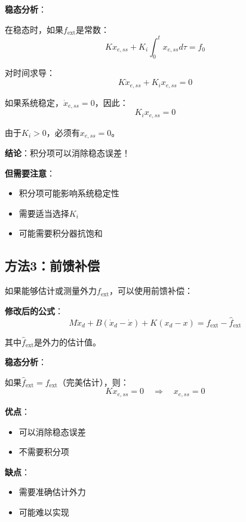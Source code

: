 \documentclass[12pt,a4paper]{article}
\begin{document}
\textbf{稳态分析}：

在稳态时，如果$f_{\text{ext}}$是常数：
\begin{equation}
K x_{e,ss} + K_i \int_0^t x_{e,ss} d\tau = f_0
\end{equation}

对时间求导：
\begin{equation}
K \dot{x}_{e,ss} + K_i x_{e,ss} = 0
\end{equation}

如果系统稳定，$\dot{x}_{e,ss} = 0$，因此：
\begin{equation}
K_i x_{e,ss} = 0
\end{equation}

由于$K_i > 0$，必须有$x_{e,ss} = 0$。

\textbf{结论}：积分项可以消除稳态误差！

\textbf{但需要注意}：
\begin{itemize}
\item 积分项可能影响系统稳定性
\item 需要适当选择$K_i$
\item 可能需要积分器抗饱和
\end{itemize}

\subsection{方法3：前馈补偿}

如果能够估计或测量外力$f_{\text{ext}}$，可以使用前馈补偿：

\textbf{修改后的公式}：
\begin{equation}
M\ddot{x}_d + B(\dot{x}_d - \dot{x}) + K(x_d - x) = f_{\text{ext}} - \hat{f}_{\text{ext}}
\end{equation}

其中$\hat{f}_{\text{ext}}$是外力的估计值。

\textbf{稳态分析}：

如果$\hat{f}_{\text{ext}} = f_{\text{ext}}$（完美估计），则：
\begin{equation}
K x_{e,ss} = 0 \quad \Rightarrow \quad x_{e,ss} = 0
\end{equation}

\textbf{优点}：
\begin{itemize}
\item 可以消除稳态误差
\item 不需要积分项
\end{itemize}

\textbf{缺点}：
\begin{itemize}
\item 需要准确估计外力
\item 可能难以实现
\end{itemize}
\end{document}
